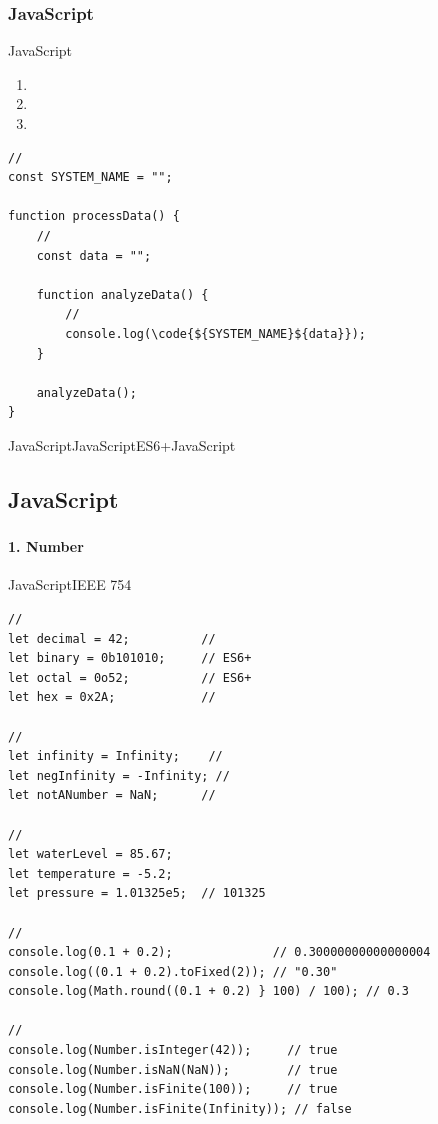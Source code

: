 \hypertarget{javascript-5}{%
\subsubsection{JavaScript}\label{javascript-5}}

JavaScript\important{}

\begin{enumerate}
\def\labelenumi{\arabic{enumi}.}
\item
  \important{}
\item
  \important{}
\item
  \important{}
\end{enumerate}

\begin{lstlisting}[style=javascript]
// 
const SYSTEM_NAME = "";

function processData() {
    // 
    const data = "";
    
    function analyzeData() {
        // 
        console.log(\code{${SYSTEM_NAME}${data}});
    }
    
    analyzeData();
}
\end{lstlisting}

JavaScriptJavaScriptES6+JavaScript

\hypertarget{javascript-6}{%
\subsection{JavaScript}\label{javascript-6}}

\hypertarget{section-19}{%
\subsubsection{}\label{section-19}}

\hypertarget{number}{%
\paragraph{1. Number}\label{number}}

JavaScriptIEEE 754

\begin{lstlisting}[style=javascript]
// 
let decimal = 42;          // 
let binary = 0b101010;     // ES6+
let octal = 0o52;          // ES6+
let hex = 0x2A;            // 

// 
let infinity = Infinity;    // 
let negInfinity = -Infinity; // 
let notANumber = NaN;      // 

// 
let waterLevel = 85.67;
let temperature = -5.2;
let pressure = 1.01325e5;  // 101325

// 
console.log(0.1 + 0.2);              // 0.30000000000000004
console.log((0.1 + 0.2).toFixed(2)); // "0.30"
console.log(Math.round((0.1 + 0.2) } 100) / 100); // 0.3

// 
console.log(Number.isInteger(42));     // true
console.log(Number.isNaN(NaN));        // true
console.log(Number.isFinite(100));     // true
console.log(Number.isFinite(Infinity)); // false
\end{lstlisting}

